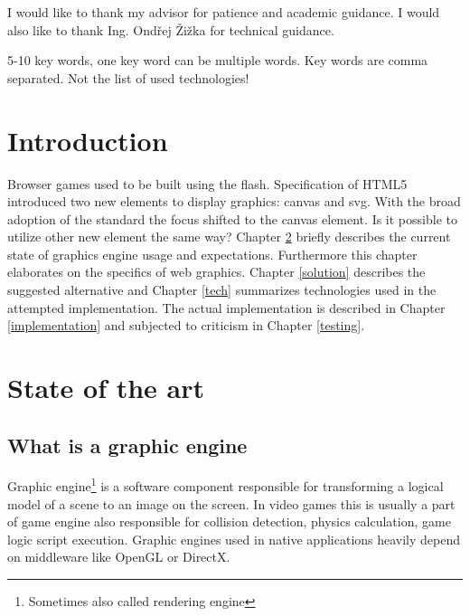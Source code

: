 \documentclass[11pt,oneside, final]{fithesis2}
\begin{document}
  
\FrontMatter  
\ThesisTitlePage  
 
\begin{ThesisDeclaration}  
\DeclarationText  
\AdvisorName  
\end{ThesisDeclaration}  
 
\begin{ThesisThanks}  
I would like to thank my advisor for patience and academic guidance. I would also like to thank Ing. Ondřej Žižka for technical guidance.
\end{ThesisThanks}  
 
\begin{ThesisAbstract}  

\end{ThesisAbstract}  
 
\begin{ThesisKeyWords}  
5-10 key words, one key word can be multiple words. Key words are comma separated. Not the list of used technologies!
\end{ThesisKeyWords}  
 
\MainMatter
 
\tableofcontents          %
 
\chapter{Introduction}
Browser games used to be built using the flash\cite{}. Specification of HTML5 introduced two new elements to display graphics: canvas and svg\cite{w3_html5}. With the broad adoption of the standard the focus shifted to the canvas element\cite{}. Is it possible to utilize other new element the same way? Chapter \ref{theory} briefly describes the current state of graphics engine usage and expectations. Furthermore this chapter elaborates on the specifics of web graphics. Chapter \ref{solution} describes the suggested alternative and Chapter \ref{tech} summarizes technologies used in the attempted implementation. The actual implementation is described in Chapter \ref{implementation} and subjected to criticism in Chapter \ref{testing}.

\chapter{State of the art}
\label{theory}

\section{What is a graphic engine}
Graphic engine\footnote{Sometimes also called rendering engine\cite{}} is a software component responsible for transforming a logical model of a scene to an image on the screen. In video games this is usually a part of game engine also responsible for collision detection, physics calculation, game logic script execution\cite{}. Graphic engines used in native applications heavily depend on middleware like OpenGL or DirectX\cite{}. 
\end{document}
